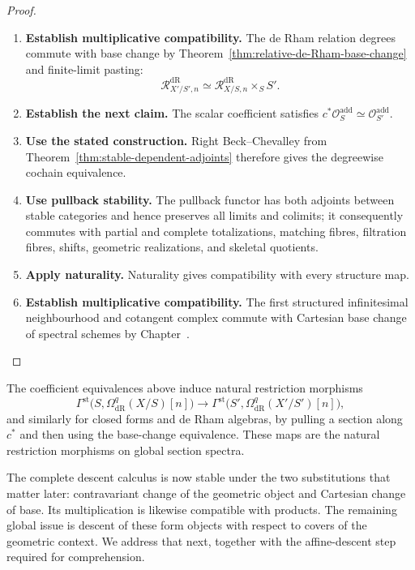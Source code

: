 \begin{proof}
\leavevmode
\begin{enumerate}[label=\textup{(\arabic*)}]
    \item \textbf{Establish multiplicative compatibility.}
    The de Rham relation degrees commute with base change by
    Theorem~\ref{thm:relative-de-Rham-base-change} and finite-limit pasting:
    \[
    \mathcal R^{\mathrm{dR}}_{X'/S',n}
    \simeq
    \mathcal R^{\mathrm{dR}}_{X/S,n}\times_SS'.
    \]
    \item \textbf{Establish the next claim.}
    The scalar coefficient satisfies
    \(c^*\mathcal O_S^{\mathrm{add}}\simeq\mathcal O_{S'}^{\mathrm{add}}\).
    \item \textbf{Use the stated construction.}
    Right Beck--Chevalley from
    Theorem~\ref{thm:stable-dependent-adjoints} therefore gives the degreewise cochain
    equivalence.
    \item \textbf{Use pullback stability.}
    The pullback functor has both adjoints between stable categories and
    hence preserves all limits and colimits; it consequently commutes with partial and
    complete totalizations, matching fibres, filtration fibres, shifts, geometric
    realizations, and skeletal quotients.
    \item \textbf{Apply naturality.}
    Naturality gives compatibility with every
    structure map.
    \item \textbf{Establish multiplicative compatibility.}
    The first structured infinitesimal neighbourhood and cotangent complex
    commute with Cartesian base change of spectral schemes by
    Chapter~.
\end{enumerate}
\end{proof}

\begin{construction}
The coefficient equivalences above induce natural restriction morphisms
\[
  \Gamma^{\mathrm{st}}
  \bigl(S,\Omega^q_{\mathrm{dR}}(X/S)[n]\bigr)
  \longrightarrow
  \Gamma^{\mathrm{st}}
  \bigl(S',\Omega^q_{\mathrm{dR}}(X'/S')[n]\bigr),
\]
and similarly for closed forms and de Rham algebras, by pulling a section along
\(c^*\) and then using the base-change equivalence. These maps are the natural restriction morphisms on global section spectra.
\end{construction}


The complete descent calculus is now stable under the two substitutions that
matter later: contravariant change of the geometric object and Cartesian
change of base. Its multiplication is likewise compatible with products.
The remaining global issue is descent of these form objects with respect to
covers of the geometric context. We address that next, together with the
affine-descent step required for comprehension.
